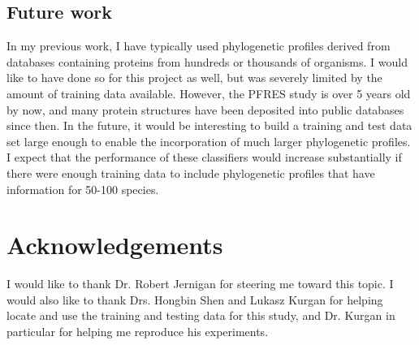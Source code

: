 \documentclass{bioinfo}
\begin{document}
\subsection*{Future work}
In my previous work, I have typically used phylogenetic profiles derived from databases containing proteins from hundreds or thousands of organisms.
I would like to have done so for this project as well, but was severely limited by the amount of training data available.
However, the PFRES study is over 5 years old by now, and many protein structures have been deposited into public databases since then.
In the future, it would be interesting to build a training and test data set large enough to enable the incorporation of much larger phylogenetic profiles.
I expect that the performance of these classifiers would increase substantially if there were enough training data to include phylogenetic profiles that have information for 50-100 species.

\section*{Acknowledgements}
I would like to thank Dr. Robert Jernigan for steering me toward this topic. I would also like to thank Drs. Hongbin Shen and Lukasz Kurgan for helping locate and use the training and testing data for this study, and Dr. Kurgan in particular for helping me reproduce his experiments.
\end{document}
